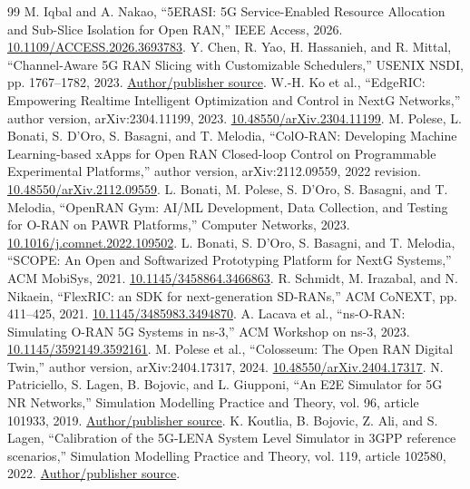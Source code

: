 \documentclass[10pt,a4paper]{article}
\begin{document}
\begin{thebibliography}{99}
 M. Iqbal and A. Nakao, ``5ERASI: 5G Service-Enabled Resource Allocation and Sub-Slice Isolation for Open RAN,'' IEEE Access, 2026. \href{https://doi.org/10.1109/ACCESS.2026.3693783}{10.1109/ACCESS.2026.3693783}.
 Y. Chen, R. Yao, H. Hassanieh, and R. Mittal, ``Channel-Aware 5G RAN Slicing with Customizable Schedulers,'' USENIX NSDI, pp. 1767--1782, 2023. \href{https://www.usenix.org/conference/nsdi23/presentation/chen-yongzhou}{Author/publisher source}.
 W.-H. Ko et al., ``EdgeRIC: Empowering Realtime Intelligent Optimization and Control in NextG Networks,'' author version, arXiv:2304.11199, 2023. \href{https://doi.org/10.48550/arXiv.2304.11199}{10.48550/arXiv.2304.11199}.
 M. Polese, L. Bonati, S. D'Oro, S. Basagni, and T. Melodia, ``ColO-RAN: Developing Machine Learning-based xApps for Open RAN Closed-loop Control on Programmable Experimental Platforms,'' author version, arXiv:2112.09559, 2022 revision. \href{https://doi.org/10.48550/arXiv.2112.09559}{10.48550/arXiv.2112.09559}.
 L. Bonati, M. Polese, S. D'Oro, S. Basagni, and T. Melodia, ``OpenRAN Gym: AI/ML Development, Data Collection, and Testing for O-RAN on PAWR Platforms,'' Computer Networks, 2023. \href{https://doi.org/10.1016/j.comnet.2022.109502}{10.1016/j.comnet.2022.109502}.
 L. Bonati, S. D'Oro, S. Basagni, and T. Melodia, ``SCOPE: An Open and Softwarized Prototyping Platform for NextG Systems,'' ACM MobiSys, 2021. \href{https://doi.org/10.1145/3458864.3466863}{10.1145/3458864.3466863}.
 R. Schmidt, M. Irazabal, and N. Nikaein, ``FlexRIC: an SDK for next-generation SD-RANs,'' ACM CoNEXT, pp. 411--425, 2021. \href{https://doi.org/10.1145/3485983.3494870}{10.1145/3485983.3494870}.
 A. Lacava et al., ``ns-O-RAN: Simulating O-RAN 5G Systems in ns-3,'' ACM Workshop on ns-3, 2023. \href{https://doi.org/10.1145/3592149.3592161}{10.1145/3592149.3592161}.
 M. Polese et al., ``Colosseum: The Open RAN Digital Twin,'' author version, arXiv:2404.17317, 2024. \href{https://doi.org/10.48550/arXiv.2404.17317}{10.48550/arXiv.2404.17317}.
 N. Patriciello, S. Lagen, B. Bojovic, and L. Giupponi, ``An E2E Simulator for 5G NR Networks,'' Simulation Modelling Practice and Theory, vol. 96, article 101933, 2019. \href{https://5g-lena.cttc.es/papers/}{Author/publisher source}.
 K. Koutlia, B. Bojovic, Z. Ali, and S. Lagen, ``Calibration of the 5G-LENA System Level Simulator in 3GPP reference scenarios,'' Simulation Modelling Practice and Theory, vol. 119, article 102580, 2022. \href{https://5g-lena.cttc.es/features/calibration/}{Author/publisher source}.

\end{thebibliography}
\end{document}
